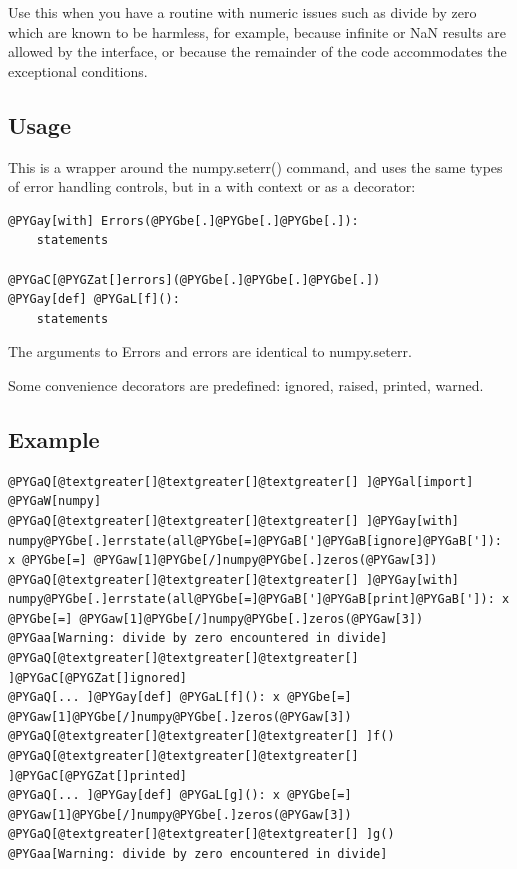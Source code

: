 \documentclass[letterpaper,10pt,english]{sphinxmanual}
\begin{document}
Use this when you have a routine with numeric issues such as divide by zero
which are known to be harmless, for example, because infinite or NaN results
are allowed by the interface, or because the remainder of the code accommodates
the exceptional conditions.


\subsection{Usage}
\label{api/numpyerrors:usage}
This is a wrapper around the numpy.seterr() command, and uses the same
types of error handling controls, but in a with context or as a decorator:

\begin{Verbatim}[commandchars=@\[\]]
@PYGay[with] Errors(@PYGbe[.]@PYGbe[.]@PYGbe[.]):
    statements

@PYGaC[@PYGZat[]errors](@PYGbe[.]@PYGbe[.]@PYGbe[.])
@PYGay[def] @PYGaL[f]():
    statements
\end{Verbatim}

The arguments to Errors and errors are identical to numpy.seterr.

Some convenience decorators are predefined: ignored, raised, printed, warned.


\subsection{Example}
\label{api/numpyerrors:example}
\begin{Verbatim}[commandchars=@\[\]]
@PYGaQ[@textgreater[]@textgreater[]@textgreater[] ]@PYGal[import] @PYGaW[numpy]
@PYGaQ[@textgreater[]@textgreater[]@textgreater[] ]@PYGay[with] numpy@PYGbe[.]errstate(all@PYGbe[=]@PYGaB[']@PYGaB[ignore]@PYGaB[']): x @PYGbe[=] @PYGaw[1]@PYGbe[/]numpy@PYGbe[.]zeros(@PYGaw[3])
@PYGaQ[@textgreater[]@textgreater[]@textgreater[] ]@PYGay[with] numpy@PYGbe[.]errstate(all@PYGbe[=]@PYGaB[']@PYGaB[print]@PYGaB[']): x @PYGbe[=] @PYGaw[1]@PYGbe[/]numpy@PYGbe[.]zeros(@PYGaw[3]) 
@PYGaa[Warning: divide by zero encountered in divide]
@PYGaQ[@textgreater[]@textgreater[]@textgreater[] ]@PYGaC[@PYGZat[]ignored]
@PYGaQ[... ]@PYGay[def] @PYGaL[f](): x @PYGbe[=] @PYGaw[1]@PYGbe[/]numpy@PYGbe[.]zeros(@PYGaw[3])
@PYGaQ[@textgreater[]@textgreater[]@textgreater[] ]f()
@PYGaQ[@textgreater[]@textgreater[]@textgreater[] ]@PYGaC[@PYGZat[]printed]
@PYGaQ[... ]@PYGay[def] @PYGaL[g](): x @PYGbe[=] @PYGaw[1]@PYGbe[/]numpy@PYGbe[.]zeros(@PYGaw[3])
@PYGaQ[@textgreater[]@textgreater[]@textgreater[] ]g() 
@PYGaa[Warning: divide by zero encountered in divide]
\end{Verbatim}
\end{document}
